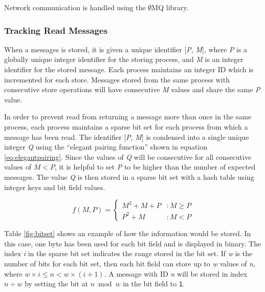 \documentclass[lnicst]{svmultln}
\begin{document}
Network communication is handled using the $\emptyset$MQ library.

\subsubsection{Tracking Read Messages}\label{sec:readmessages}

    When a messages is stored, it is given a unique identifier [\textit{P}, \textit{M}], where \textit{P} is a globally unique integer identifier for the storing process, and \textit{M} is an integer identifier for the stored message. Each process maintains an integer ID which is incremented for each store. Messages stored from the same process with consecutive store operations will have consecutive \textit{M} values and share the same \textit{P} value.

    In order to prevent read from returning a message more than once in the same process, each process maintains a sparse bit set for each process from which a message has been read. The identifier [\textit{P}, \textit{M}] is condensed into a single unique integer \textit{Q} using the ``elegant pairing function''\cite{szudzikelegant} shown in equation \ref{eq:elegantpairing}. Since the values of \textit{Q} will be consecutive for all consecutive values of $M < P$, it is helpful to set \textit{P} to be higher than the number of expected messages. The value \textit{Q} is then stored in a sparse bit set with a hash table using integer keys and bit field values.

 \begin{equation}
   f(M,P) = \left\{
     \begin{array}{lr}
       M^{2} + M + P & : M \geq P \\
       P^{2} + M & : M < P
     \end{array}
   \right.
   \label{eq:elegantpairing}
\end{equation}

Table \ref{fig:bitset} shows an example of how the information would be stored. In this case, one byte has been used for each bit field and is displayed in binary. The index \textit{i} in the sparse bit set indicates the range stored in the bit set. If \textit{w} is the number of bits for each bit set, then each bit field can store up to \textit{w} values of \textit{n}, where $w \times i \leq n < w \times (i + 1)$. A message with ID \textit{n} will be stored in index $n \div w$ by setting the bit at $n \bmod w$ in the bit field to \texttt{1}.
\end{document}
